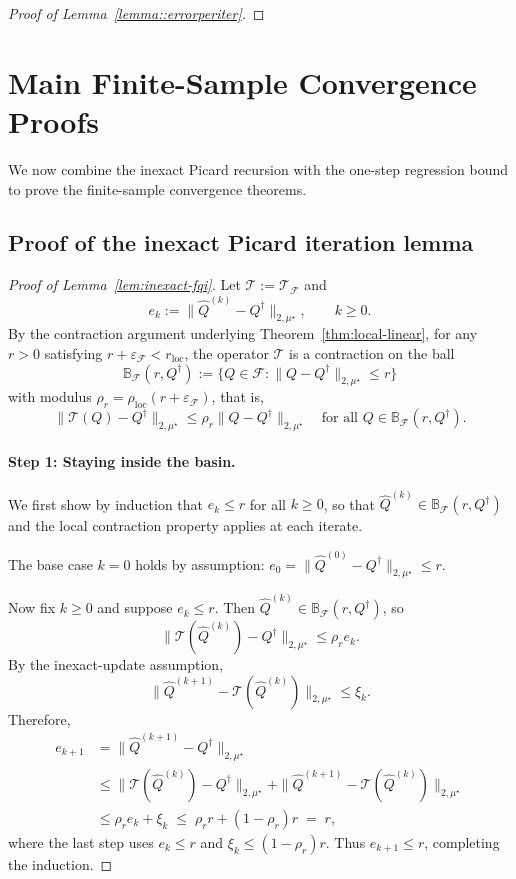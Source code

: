 \documentclass{article}
\theoremstyle{plain}
\theoremstyle{definition}
\theoremstyle{remark}
\begin{document}
\begin{proof}[Proof of Lemma~\ref{lemma::errorperiter}]
\end{proof}


\section{Main Finite-Sample Convergence Proofs}
\label{app:main-finite-sample-convergence-proofs}

We now combine the inexact Picard recursion with the one-step regression bound to prove the finite-sample convergence theorems.

\subsection{Proof of the inexact Picard iteration lemma}

\begin{proof}[Proof of Lemma~\ref{lem:inexact-fqi}]
Let \(\mathcal T := \mathcal T_{\mathcal F}\) and
\[
e_k := \|\widehat Q^{(k)} - Q^\dagger\|_{2,\mu^\star},
\qquad k \ge 0.
\]
By the contraction argument underlying Theorem~\ref{thm:local-linear}, for any
\(r>0\) satisfying \(r+\varepsilon_{\mathcal F}<r_{\mathrm{loc}}\), the operator
\(\mathcal T\) is a contraction on the ball
\[
\mathbb B_{\mathcal F}(r, Q^\dagger)
:=
\{Q \in \mathcal F : \|Q - Q^\dagger\|_{2,\mu^\star} \le r\}
\]
with modulus \(\rho_r = \rho_{\mathrm{loc}}(r+\varepsilon_{\mathcal F})\), that is,
\[
\|\mathcal T(Q) - Q^\dagger\|_{2,\mu^\star}
\le
\rho_r \|Q - Q^\dagger\|_{2,\mu^\star}
\quad
\text{for all } Q \in \mathbb B_{\mathcal F}(r, Q^\dagger).
\]

\paragraph{Step 1: Staying inside the basin.}
We first show by induction that \(e_k \le r\) for all \(k \ge 0\), so that
\(\widehat Q^{(k)} \in \mathbb B_{\mathcal F}(r, Q^\dagger)\) and the
local contraction property applies at each iterate.

The base case \(k = 0\) holds by assumption:
\(e_0 = \|\widehat Q^{(0)} - Q^\dagger\|_{2,\mu^\star} \le r\).

Now fix \(k \ge 0\) and suppose \(e_k \le r\). Then
\(\widehat Q^{(k)} \in \mathbb B_{\mathcal F}(r, Q^\dagger)\), so
\[
\|\mathcal T(\widehat Q^{(k)}) - Q^\dagger\|_{2,\mu^\star}
\le
\rho_r e_k.
\]
By the inexact-update assumption,
\[
\|\widehat Q^{(k+1)}
-\mathcal T(\widehat Q^{(k)})\|_{2,\mu^\star}
\le \xi_k.
\]
Therefore,
\begin{align*}
e_{k+1}
&=
\|\widehat Q^{(k+1)} - Q^\dagger\|_{2,\mu^\star}
\\
&\le
\|\mathcal T(\widehat Q^{(k)}) - Q^\dagger\|_{2,\mu^\star}
+
\|\widehat Q^{(k+1)}-\mathcal T(\widehat Q^{(k)})\|_{2,\mu^\star}
\\
&\le
\rho_r e_k + \xi_k
\;\le\;
\rho_r r + (1-\rho_r) r
\;=\;
r,
\end{align*}
where the last step uses \(e_k \le r\) and
\(\xi_k \le (1-\rho_r)r\). Thus \(e_{k+1} \le r\), completing the induction.


\end{proof}
\end{document}
